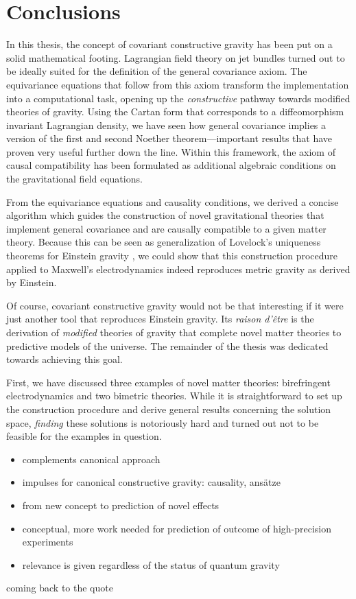 \chapter{Conclusions}

In this thesis, the concept of covariant constructive gravity has been put on a solid mathematical footing. Lagrangian field theory on jet bundles turned out to be ideally suited for the definition of the general covariance axiom. The equivariance equations that follow from this axiom transform the implementation into a computational task, opening up the \emph{constructive} pathway towards modified theories of gravity. Using the Cartan form that corresponds to a diffeomorphism invariant Lagrangian density, we have seen how general covariance implies a version of the first and second Noether theorem---important results that have proven very useful further down the line. Within this framework, the axiom of causal compatibility has been formulated as additional algebraic conditions on the gravitational field equations.

From the equivariance equations and causality conditions, we derived a concise algorithm which guides the construction of novel gravitational theories that implement general covariance and are causally compatible to a given matter theory. Because this can be seen as generalization of Lovelock's uniqueness theorems for Einstein gravity \cite{Lovelock_1969,Lovelock_1971,Lovelock_1972}, we could show that this construction procedure applied to Maxwell's electrodynamics indeed reproduces metric gravity as derived by Einstein.

Of course, covariant constructive gravity would not be that interesting if it were just another tool that reproduces Einstein gravity. Its \emph{raison d'\^etre} is the derivation of \emph{modified} theories of gravity that complete novel matter theories to predictive models of the universe. The remainder of the thesis was dedicated towards achieving this goal.

First, we have discussed three examples of novel matter theories: birefringent electrodynamics and two bimetric theories. While it is straightforward to set up the construction procedure and derive general results concerning the solution space, \emph{finding} these solutions is notoriously hard and turned out not to be feasible for the examples in question.

\begin{itemize}
\item complements canonical approach
\item impulses for canonical constructive gravity: causality, ansätze
\item from new concept to prediction of novel effects
\item conceptual, more work needed for prediction of outcome of high-precision experiments
\item relevance is given regardless of the status of quantum gravity
\end{itemize}

coming back to the quote
